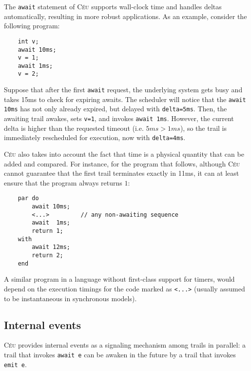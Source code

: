 \documentclass[10pt]{sensys-proc}
\newcommand{\CEU}{\textsc{C\'{e}u}\xspace}
\newcommand{\code}[1] {{\small{\texttt{#1}}}}
\begin{document}
The \code{await} statement of \CEU supports wall-clock time and handles deltas 
automatically, resulting in more robust applications.
As an example, consider the following program:

{\small
\begin{verbatim}
    int v;
    await 10ms;
    v = 1;
    await 1ms;
    v = 2;
\end{verbatim}
}

Suppose that after the first \code{await} request, the underlying system gets 
busy and takes 15ms to check for expiring awaits.
The scheduler will notice that the \code{await 10ms} has not only already 
expired, but delayed with \code{delta=5ms}.
Then, the awaiting trail awakes, sets \code{v=1}, and invokes \code{await 1ms}.
However, the current delta is higher than the requested timeout (i.e. $5ms > 
1ms$), so the trail is immediately rescheduled for execution, now with 
\code{delta=4ms}.

\CEU also takes into account the fact that time is a physical quantity that can 
be added and compared.
For instance, for the program that follows, although \CEU cannot guarantee that 
the first trail terminates exactly in 11ms, it can at least ensure that the 
program always returns $1$:

{\small
\begin{verbatim}
    par do
        await 10ms;
        <...>         // any non-awaiting sequence
        await  1ms;
        return 1;
    with
        await 12ms;
        return 2;
    end
\end{verbatim}
}

A similar program in a language without first-class support for timers, would 
depend on the execution timings for the code marked as \code{<...>} (usually 
assumed to be instantaneous in synchronous models).



\subsection{Internal events}
\label{sec.ceu.time}

\CEU provides internal events as a signaling mechanism among trails in 
parallel:
a trail that invokes \code{await~e} can be awaken in the future by a trail that 
invokes \code{emit~e}.
\end{document}
